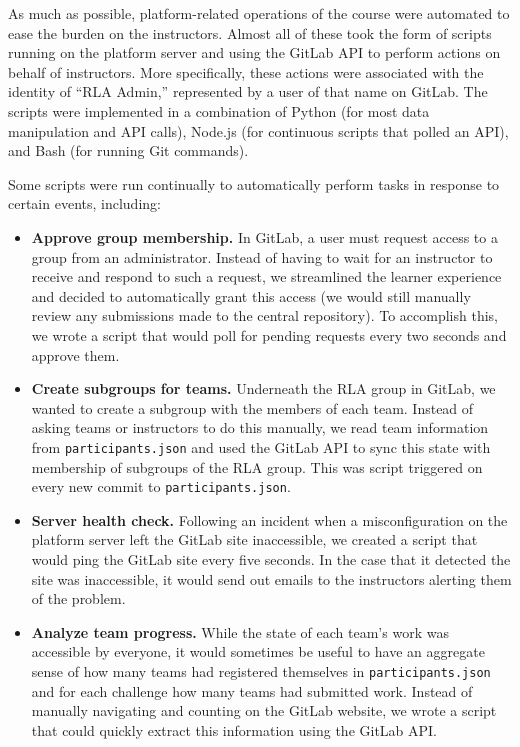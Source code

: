 \documentclass[12pt,twoside]{mitthesis}
\newcommand{\review}[1]{{\color{mygreen} #1}}
\begin{document}
\review{As much as possible, platform-related operations of the course were automated to ease the burden on the instructors. Almost all of these took the form of scripts running on the platform server and using the GitLab API to perform actions on behalf of instructors. More specifically, these actions were associated with the identity of ``RLA Admin,'' represented by a user of that name on GitLab. The scripts were implemented in a combination of Python (for most data manipulation and API calls), Node.js (for continuous scripts that polled an API), and Bash (for running Git commands).

Some scripts were run continually to automatically perform tasks in response to certain events, including:
\begin{itemize}
\item \textbf{Approve group membership.} In GitLab, a user must request access to a group from an administrator. Instead of having to wait for an instructor to receive and respond to such a request, we streamlined the learner experience and decided to automatically grant this access (we would still manually review any submissions made to the central repository). To accomplish this, we wrote a script that would poll for pending requests every two seconds and approve them. 
\item \textbf{Create subgroups for teams.} Underneath the RLA group in GitLab, we wanted to create a subgroup with the members of each team. Instead of asking teams or instructors to do this manually, we read team information from \texttt{participants.json} and used the GitLab API to sync this state with membership of subgroups of the RLA group. This was script triggered on every new commit to \texttt{participants.json}.
\item \textbf{Server health check.} Following an incident when a misconfiguration on the platform server left the GitLab site inaccessible, we created a script that would ping the GitLab site every five seconds. In the case that it detected the site was inaccessible, it would send out emails to the instructors alerting them of the problem.
\item \textbf{Analyze team progress.} While the state of each team's work was accessible by everyone, it would sometimes be useful to have an aggregate sense of how many teams had registered themselves in \texttt{participants.json} and for each challenge how many teams had submitted work. Instead of manually navigating and counting on the GitLab website, we wrote a script that could quickly extract this information using the GitLab API.
\end{itemize}

}
\end{document}

